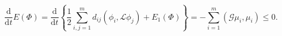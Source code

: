 \documentclass[final,review,onefignum,onetabnum]{siamart190516}
\theoremstyle{plain}
\begin{document}
\begin{equation}
\frac{\mathrm{d}}{\mathrm{d} t} E\left(\Phi\right)=\frac{\mathrm{d}}{\mathrm{d} t}\left\{\frac{1}{2} \sum_{i, j=1}^{m} d_{i j}\left(\phi_{i}, \mathcal{L} \phi_{j}\right)+E_{1}\left(\Phi\right)\right\}=-\sum_{i=1}^{m}\left(\mathcal{G} \mu_{i}, \mu_{i}\right) \leq 0.
\end{equation}
 
\end{document}
